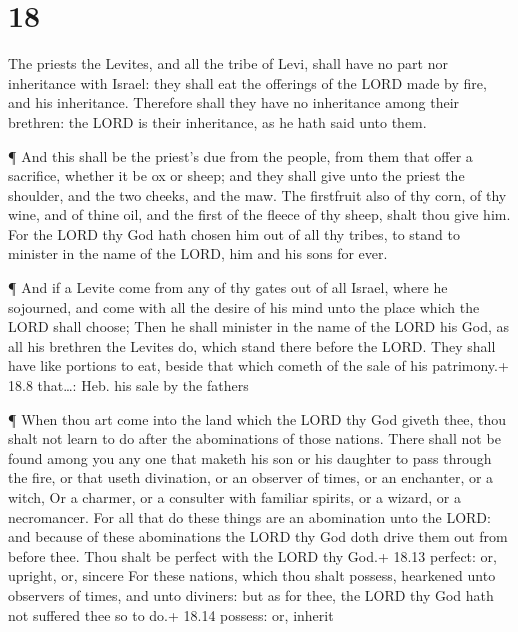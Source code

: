 \hypertarget{section-17}{%
\section{18}\label{section-17}}

 The priests the Levites, and all the tribe of Levi, shall
have no part nor inheritance with Israel: they shall eat the offerings
of the LORD made by fire, and his inheritance.  Therefore
shall they have no inheritance among their brethren: the LORD is their
inheritance, as he hath said unto them.

 ¶ And this shall be the priest's due from the people, from
them that offer a sacrifice, whether it be ox or sheep; and they shall
give unto the priest the shoulder, and the two cheeks, and the maw.
 The firstfruit also of thy corn, of thy wine, and of thine
oil, and the first of the fleece of thy sheep, shalt thou give him.
 For the LORD thy God hath chosen him out of all thy tribes,
to stand to minister in the name of the LORD, him and his sons for ever.

 ¶ And if a Levite come from any of thy gates out of all
Israel, where he sojourned, and come with all the desire of his mind
unto the place which the LORD shall choose;  Then he shall
minister in the name of the LORD his God, as all his brethren the
Levites do, which stand there before the LORD.  They shall
have like portions to eat, beside that which cometh of the sale of his
patrimony.+ 18.8 that\ldots: Heb. his sale by the fathers

 ¶ When thou art come into the land which the LORD thy God
giveth thee, thou shalt not learn to do after the abominations of those
nations.  There shall not be found among you any one that
maketh his son or his daughter to pass through the fire, or that useth
divination, or an observer of times, or an enchanter, or a witch,
 Or a charmer, or a consulter with familiar spirits, or a
wizard, or a necromancer.  For all that do these things are
an abomination unto the LORD: and because of these abominations the LORD
thy God doth drive them out from before thee.  Thou shalt
be perfect with the LORD thy God.+ 18.13 perfect: or, upright, or,
sincere  For these nations, which thou shalt possess,
hearkened unto observers of times, and unto diviners: but as for thee,
the LORD thy God hath not suffered thee so to do.+ 18.14 possess: or,
inherit

